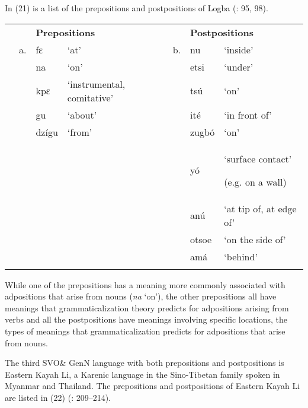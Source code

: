 \documentclass[output=paper]{langsci/langscibook}
\begin{document}
In (21) is a list of the prepositions and postpositions of Logba (\citealt{Dorvlo2008}: 95, 98).


\begin{table}
\begin{tabularx}{\textwidth}{XXXXXXX} &  & \multicolumn{2}{X}{\bfseries Prepositions} &  & \multicolumn{2}{X}{\bfseries Postpositions}\\
\lsptoprule
& a. & fɛ & ‘at’ & b. & nu & ‘inside’\\
&  & na & ‘on’ &  & etsi & ‘under’\\
&  & kpɛ & ‘instrumental, comitative’ &  & tsú & ‘on’\\
&  & gu & ‘about’ &  & ité & ‘in front of’\\
&  & dzígu & ‘from’ &  & zugbó & ‘on’\\
&  &  &  &  & yó & {‘surface contact’}

(e.g. on a wall)\\
&  &  &  &  & anú & ‘at tip of, at edge of’\\
&  &  &  &  & otsoe & ‘on the side of’\\
&  &  &  &  & amá & ‘behind’\\
\lspbottomrule
\end{tabularx}
\end{table}


While one of the prepositions has a meaning more commonly associated with adpositions that arise from nouns (\textit{na} ‘on’), the other prepositions all have meanings that grammaticalization theory predicts for adpositions arising from verbs and all the postpositions have meanings involving specific locations, the types of meanings that grammaticalization predicts for adpositions that arise from nouns.

The third SVO\& GenN language with both prepositions and postpositions is Eastern Kayah Li, a Karenic language in the Sino-Tibetan family spoken in Myanmar and Thailand. The prepositions and postpositions of Eastern Kayah Li are listed in (22) (\citealt{Solnit1997}: 209–214).
\end{document}

